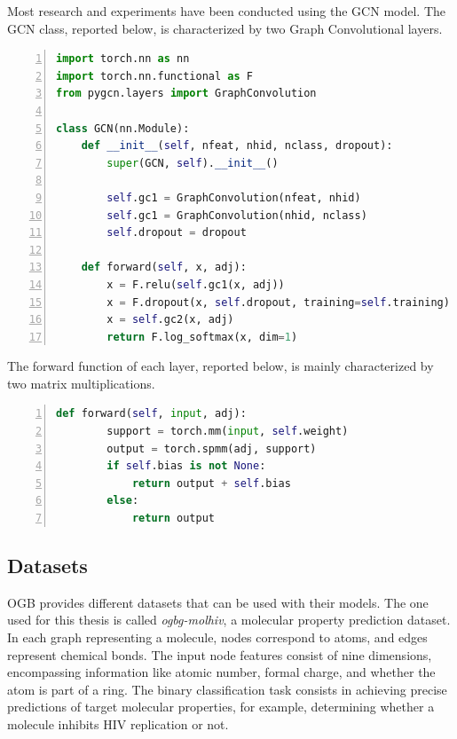 Most research and experiments have been conducted using the GCN model.
The GCN class, reported below, is characterized by two Graph Convolutional layers.

\begin{lstlisting}[language=Python,label={lst:gcn-class}, numbers=left, xleftmargin=1em, caption=Class of GCN model]
import torch.nn as nn
import torch.nn.functional as F
from pygcn.layers import GraphConvolution

class GCN(nn.Module):
    def __init__(self, nfeat, nhid, nclass, dropout):
        super(GCN, self).__init__()

        self.gc1 = GraphConvolution(nfeat, nhid)
        self.gc1 = GraphConvolution(nhid, nclass)
        self.dropout = dropout

    def forward(self, x, adj):
        x = F.relu(self.gc1(x, adj))
        x = F.dropout(x, self.dropout, training=self.training)
        x = self.gc2(x, adj)
        return F.log_softmax(x, dim=1)
\end{lstlisting}

The forward function of each layer, reported below, is mainly characterized by two matrix multiplications.

\begin{lstlisting}[language=Python,label={lst:gcn-layer-forward}, numbers=left, xleftmargin=1em, caption=Forward function of GCN layer]
    def forward(self, input, adj):
        support = torch.mm(input, self.weight)
        output = torch.spmm(adj, support)
        if self.bias is not None:
            return output + self.bias
        else:
            return output
\end{lstlisting}

\subsection{Datasets}
\label{subsec:gnn_datasets}%

OGB provides different datasets that can be used with their models.
The one used for this thesis is called \textit{ogbg-molhiv}, a molecular property prediction dataset.
In each graph representing a molecule, nodes correspond to atoms, and edges represent chemical bonds.
The input node features consist of nine dimensions, encompassing information like atomic number, formal charge, and whether the atom is part of a ring.
The binary classification task consists in achieving precise predictions of target molecular properties, for example, determining whether a molecule inhibits HIV replication or not.

